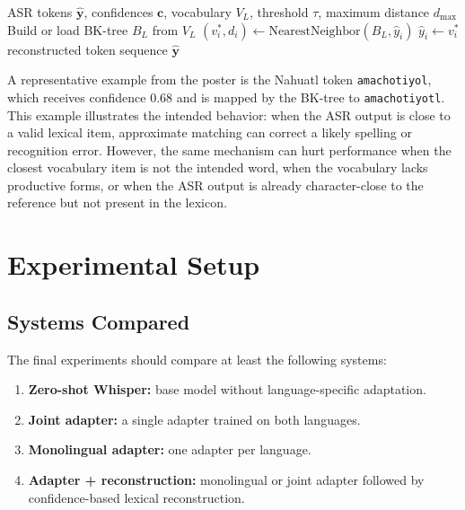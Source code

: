\documentclass[11pt]{article}
\begin{document}
\begin{algorithm}[t]
\small
\caption{Confidence-based lexical reconstruction}
\label{alg:reconstruction}
\begin{algorithmic}[1]
\Require ASR tokens $\hat{\mathbf{y}}$, confidences $\mathbf{c}$, vocabulary $V_L$, threshold $\tau$, maximum distance $d_{\max}$
\State Build or load BK-tree $B_L$ from $V_L$
        \State $(v_i^*, d_i) \gets \mathrm{NearestNeighbor}(B_L, \hat{y}_i)$
            \State $\hat{y}_i \gets v_i^*$
        \EndIf
    \EndIf
\EndFor
\State \Return reconstructed token sequence $\hat{\mathbf{y}}$
\end{algorithmic}
\end{algorithm}

A representative example from the poster is the Nahuatl token \texttt{amachotiyol}, which receives confidence 0.68 and is mapped by the BK-tree to \texttt{amachotiyotl}. This example illustrates the intended behavior: when the ASR output is close to a valid lexical item, approximate matching can correct a likely spelling or recognition error. However, the same mechanism can hurt performance when the closest vocabulary item is not the intended word, when the vocabulary lacks productive forms, or when the ASR output is already character-close to the reference but not present in the lexicon.

\section{Experimental Setup}

\subsection{Systems Compared}

The final experiments should compare at least the following systems:
\begin{enumerate}[leftmargin=*,noitemsep]
    \item \textbf{Zero-shot Whisper:} base model without language-specific adaptation.
    \item \textbf{Joint adapter:} a single adapter trained on both languages.
    \item \textbf{Monolingual adapter:} one adapter per language.
    \item \textbf{Adapter + reconstruction:} monolingual or joint adapter followed by confidence-based lexical reconstruction.
\end{enumerate}
\end{document}
